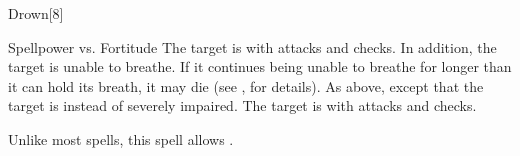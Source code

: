 \begin{spellsection}{Drown}[8]
    \begin{spellheader}
    \end{spellheader}
    \begin{spellcontent}
        \begin{spelltargetinginfo}
        \end{spelltargetinginfo}
        \begin{spelleffects}
            \begin{spellattack}{Spellpower vs. Fortitude}
                \spellsuccess The target is \severelyimpaired with attacks and checks.
                In addition, the target is unable to breathe.
                If it continues being unable to breathe for longer than it can hold its breath, it may die (see , for details).
                \spellcritical As above, except that the target is \nauseated instead of severely impaired.
                \spellfailure The target is \impaired with attacks and checks.
            \end{spellattack}
            \spelldur \durshort
        \end{spelleffects}
    \end{spellcontent}
    \begin{spellfooter}
        \spellnotes Unlike most  spells, this spell allows .
        \miscastexplode
    \end{spellfooter}
\end{spellsection}


